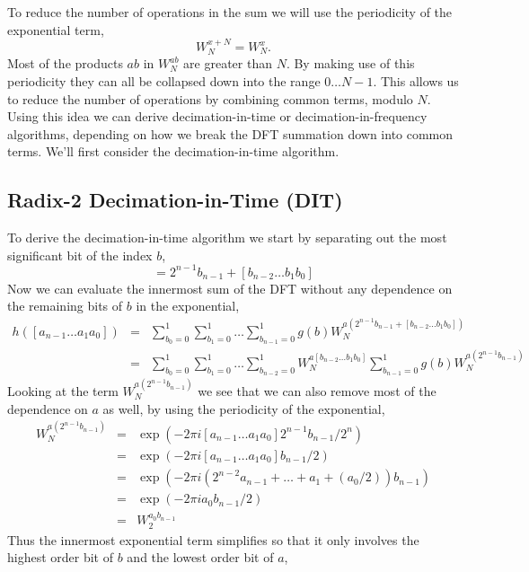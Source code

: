 \documentclass[fleqn,12pt]{article}
\begin{document}
To reduce the number of operations in the sum we will use the
periodicity of the exponential term,
%
\begin{equation}
W_N^{x+N} = W_N^{x}.
\end{equation}
%
Most of the products $ab$ in $W_N^{ab}$ are greater than $N$. By
making use of this periodicity they can all be collapsed down into the
range $0\dots N-1$. This allows us to reduce the number of operations
by combining common terms, modulo $N$. Using this idea we can derive
decimation-in-time or decimation-in-frequency algorithms, depending on
how we break the DFT summation down into common terms. We'll first
consider the decimation-in-time algorithm.

\subsection{Radix-2 Decimation-in-Time (DIT)}
%
To derive the decimation-in-time algorithm we start by separating
out the most significant bit of the index $b$,
%
\begin{equation}
[b_{n-1} \dots b_1 b_0] = 2^{n-1}b_{n-1} + [b_{n-2} \dots b_1 b_0]
\end{equation}
%
Now we can evaluate the innermost sum of the DFT without any
dependence on the remaining bits of $b$ in the exponential,
%
\begin{eqnarray} 
h([a_{n-1} \dots a_1 a_0]) &=& 
\sum_{b_0=0}^{1} 
\sum_{b_1=0}^{1} 
\dots
\sum_{b_{n-1}=0}^{1} 
 g(b) 
W_N^{a(2^{n-1}b_{n-1}+[b_{n-2} \dots b_1 b_0])} \\
 &=& 
\sum_{b_0=0}^{1} 
\sum_{b_1=0}^{1} 
\dots
\sum_{b_{n-2}=0}^{1} 
W_N^{a[b_{n-2} \dots b_1 b_0]}
\sum_{b_{n-1}=0}^{1} 
 g(b) 
W_N^{a(2^{n-1}b_{n-1})}
\end{eqnarray}
%
Looking at the term $W_N^{a(2^{n-1}b_{n-1})}$ we see that we can also
remove most of the dependence on $a$ as well, by using the periodicity of the
exponential,
%
\begin{eqnarray}
W_N^{a(2^{n-1}b_{n-1})} &=&
\exp(-2\pi i [a_{n-1} \dots a_1 a_0] 2^{n-1} b_{n-1}/ 2^n )\\
&=& \exp(-2\pi i [a_{n-1} \dots a_1 a_0] b_{n-1}/ 2 )\\
&=& \exp(-2\pi i ( 2^{n-2}a_{n-1} + \dots + a_1 + (a_0/2)) b_{n-1} )\\
&=& \exp(-2\pi i a_0 b_{n-1}/2 ) \\
&=& W_2^{a_0 b_{n-1}}
\end{eqnarray}
%
Thus the innermost exponential term simplifies so that it only
involves the highest order bit of $b$ and the lowest order bit of $a$,
\end{document}
